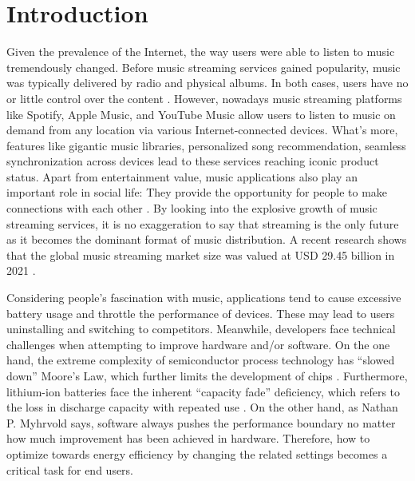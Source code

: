 \section{Introduction}
Given the prevalence of the Internet, the way users were able to listen to music tremendously changed. Before music streaming services gained popularity, music was typically delivered by radio and physical albums. In both cases, users have no or little control over the content \cite{hiller2017rise}. However, nowadays music streaming platforms like Spotify, Apple Music, and YouTube Music allow users to listen to music on demand from any location via various Internet-connected devices. What’s more, features like gigantic music libraries, personalized song recommendation, seamless synchronization across devices lead to these services reaching iconic product status. Apart from entertainment value, music applications also play an important role in social life: They provide the opportunity for people to make connections with each other \cite{oyedele2018streaming}. By looking into the explosive growth of music streaming services, it is no exaggeration to say that streaming is the only future as it becomes the dominant format of music distribution. A recent research shows that the global music streaming market size was valued at USD 29.45 billion in 2021 \cite{3}.

Considering people’s fascination with music, applications tend to cause excessive battery usage and throttle the performance of devices. These may lead to users uninstalling and switching to competitors. Meanwhile, developers face technical challenges when attempting to improve hardware and/or software. On the one hand, the extreme complexity of semiconductor process technology has “slowed down” Moore’s Law, which further limits the development of chips \cite{waldrop2016chips}. Furthermore, lithium-ion batteries face the inherent “capacity fade” deficiency, which refers to the loss in discharge capacity with repeated use \cite{spotnitz2003simulation}. On the other hand, as Nathan P. Myhrvold\cite{romaine1999invisible} says, software always pushes the performance boundary no matter how much improvement has been achieved in hardware. Therefore, how to optimize towards energy efficiency by changing the related settings becomes a critical task for end users. 

